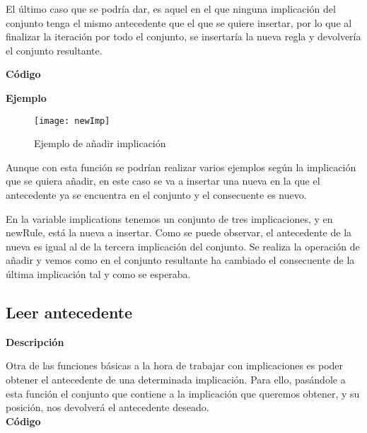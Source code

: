     El \'ultimo caso que se podr\'ia dar, es aquel en el que ninguna implicaci\'on del conjunto tenga el mismo antecedente que el que se 
    quiere insertar, por lo que al finalizar la iteraci\'on por todo el conjunto, se insertar\'ia la nueva regla y devolver\'ia el conjunto 
    resultante.
    \\

    \clearpage

    \textbf{C\'odigo}

    
    \bigskip

    \textbf{Ejemplo}


    \begin{figure}[H]
        \centering
        \texttt{[image: newImp]}
        \caption{Ejemplo de a\~nadir implicaci\'on}
        \label{fig:newImp}
    \end{figure}

    Aunque con esta funci\'on se podr\'ian realizar varios ejemplos seg\'un la implicaci\'on que se quiera a\~nadir, en este caso se 
    va a insertar una nueva en la que el antecedente ya se encuentra en el conjunto y el consecuente es nuevo.

    En la variable implications tenemos un conjunto de tres implicaciones, y en newRule, est\'a la nueva a insertar. Como se puede 
    observar, el antecedente de la nueva es igual al de la tercera implicaci\'on del conjunto. Se realiza la operaci\'on de a\~nadir 
    y vemos como en el conjunto resultante ha cambiado el consecuente de la \'ultima implicaci\'on tal y como se esperaba.



\subsection{Leer antecedente}

    \textbf{Descripci\'on}

    Otra de las funciones b\'asicas a la hora de trabajar con implicaciones es poder obtener el antecedente de una determinada 
    implicaci\'on. Para ello, pas\'andole a esta funci\'on el conjunto que contiene a la implicaci\'on que queremos obtener, y su 
    posici\'on, nos devolver\'a el antecedente deseado.
    \\


    \textbf{C\'odigo}

    
    \bigskip


